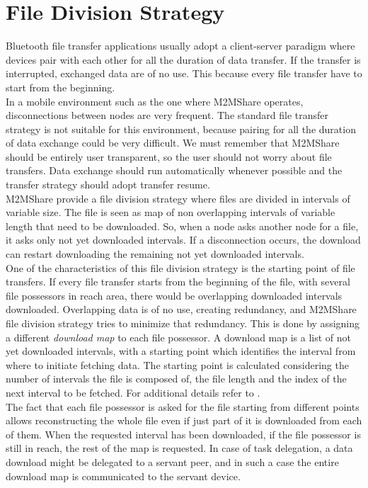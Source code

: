 \section{File Division Strategy}
\label{descrFileDivisionStrategy}
Bluetooth file transfer applications usually adopt a client-server paradigm where devices pair with each other for all the duration of data transfer. If the transfer is interrupted, exchanged data are of no use. This because every file transfer have to start from the beginning. 
\\

In a mobile environment such as the one where M2MShare operates, disconnections between nodes are very frequent. The standard file transfer strategy is not suitable for this environment, because pairing for all the duration of data exchange could be very difficult. We must remember that M2MShare should be entirely user transparent, so the user should not worry about file transfers. Data exchange should run automatically whenever possible and the transfer strategy should adopt transfer resume.
\\

M2MShare provide a file division strategy where files are divided in intervals of variable size. The file is seen as map of non overlapping intervals of variable length that need to be downloaded. So, when a node asks another node for a file, it asks only not yet downloaded intervals. If a disconnection occurs, the download can restart downloading the remaining not yet downloaded intervals.
\\

One of the characteristics of this file division strategy is the starting point of file transfers. If every file transfer starts from the beginning of the file, with several file possessors in reach area, there would be overlapping downloaded intervals downloaded. Overlapping data is of no use, creating redundancy, and M2MShare file division strategy tries to minimize that redundancy. This is done by assigning a different \textit{download map} to each file possessor. A download map is a list of not yet downloaded intervals, with a starting point which identifies the interval from where to initiate fetching data. The starting point is calculated considering the number of intervals the file is composed of, the file length and the index of the next interval to be fetched. For additional details refer to \cite{tesiarmir}.
\\

The fact that each file possessor is asked for the file starting from different points allows reconstructing the whole file even if just part of it is downloaded from each of them. When the requested interval has been downloaded, if the file possessor is still in reach, the rest of the map is requested. In case of task delegation, a data download might be delegated to a servant peer, and in such a case the entire download map is communicated to the servant device.
 
 


